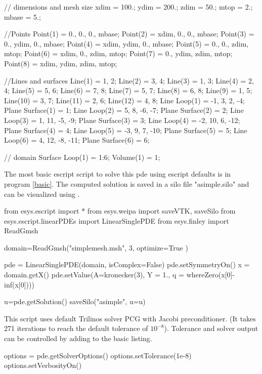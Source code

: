 \begin{python}[caption=simplemesh.geo,label=simplemesh]
// dimensions and mesh size
xdim = 100.;
ydim = 200.;
zdim = 50.;
mtop = 2.;
mbase = 5.;

//Points
Point(1) = {0., 0., 0., mbase};
Point(2) = {xdim, 0., 0., mbase};
Point(3) = {0., ydim, 0., mbase};
Point(4) = {xdim, ydim, 0., mbase};
Point(5) = {0., 0., zdim, mtop};
Point(6) = {xdim, 0., zdim, mtop};
Point(7) = {0., ydim, zdim, mtop};
Point(8) = {xdim, ydim, zdim, mtop};

//Lines and surfaces
Line(1) = {1, 2};
Line(2) = {3, 4};
Line(3) = {1, 3};
Line(4) = {2, 4};
Line(5) = {5, 6};
Line(6) = {7, 8};
Line(7) = {5, 7};
Line(8) = {6, 8};
Line(9) = {1, 5};
Line(10) = {3, 7};
Line(11) = {2, 6};
Line(12) = {4, 8};
Line Loop(1) = {-1, 3, 2, -4};
Plane Surface(1) = {1};
Line Loop(2) = {5, 8, -6, -7};
Plane Surface(2) = {2};
Line Loop(3) = {1, 11, -5, -9};
Plane Surface(3) = {3};
Line Loop(4) = {-2, 10, 6, -12};
Plane Surface(4) = {4};
Line Loop(5) = {-3, 9, 7, -10};
Plane Surface(5) = {5};
Line Loop(6) = {4, 12, -8, -11};
Plane Surface(6) = {6};

// domain
Surface Loop(1) = {1:6};
Volume(1) = {1};
\end{python}

The most basic escript script to solve this pde using escript defaults is in program \ref{basic}.  The computed solution is saved in a silo file "asimple.silo" and can be visualized using \VisIt.
\begin{python}[caption=basic solve using defaults only, label=basic ]
from esys.escript import *
from esys.weipa import saveVTK, saveSilo
from esys.escript.linearPDEs import LinearSinglePDE
from esys.finley import ReadGmsh
  
domain=ReadGmsh("simplemesh.msh", 3,  optimize=True )
       
pde = LinearSinglePDE(domain, isComplex=False)
pde.setSymmetryOn()
x = domain.getX()
pde.setValue(A=kronecker(3), Y = 1., q = whereZero(x[0]-inf(x[0])))

u=pde.getSolution()    
saveSilo("asimple", u=u)    
\end{python}

This script uses default Trilinos solver PCG with Jacobi preconditioner. (It takes 271 iterations to reach the default tolerance of $10^{-8}$).  Tolerance and solver output can be controlled by adding to the basic listing.
 \begin{python}[caption=tolerance , label=tolerance ]
options = pde.getSolverOptions()  
options.setTolerance(1e-8)        
options.setVerbosityOn()        
\end{python}



